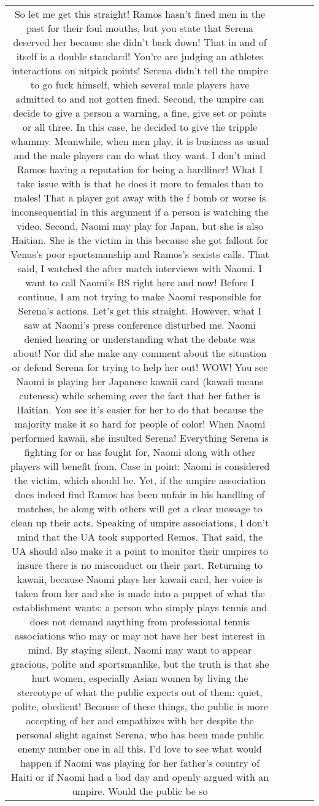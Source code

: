 \documentclass[11pt]{article}
\newlength\mylength
\begin{document}
\begin{center}
\begin{longtable}{|C{.65\mylength}|C{.30\mylength}|C{.12\mylength}|C{.12\mylength}|C{.12\mylength}|}
  \small So let me get this straight! Ramos hasn't fined men in the past for their foul mouths, but you state that Serena deserved her because she didn't back down! That in and of itself is a double standard! You're are judging an athletes interactions on nitpick points! Serena didn't tell the umpire to go fuck himself, which several male players have admitted to and not gotten fined. Second, the umpire can decide to give a person a warning, a fine, give set or points or all three. In this case, he decided to give the tripple whammy. Meanwhile, when men play, it is business as usual and the male players can do what they want. I don't mind Ramos having a reputation for being a hardliner! What I take issue with is that he does it more to females than to males! That a player got away with the f bomb or worse is inconsequential in this argument if a person is watching the video. Second, Naomi may play for Japan, but she is also Haitian. She is the victim in this  because she got fallout for Venus's poor sportsmanship and Ramos's sexists calls. That said, I watched the after match interviews with Naomi. I want to call Naomi's BS right here and now! Before I continue, I am not trying to make Naomi responsible for Serena's actions. Let's get this straight. However, what I saw at Naomi's press conference disturbed me. Naomi denied hearing or understanding what the debate was about! Nor did she make any comment about the situation or defend Serena for trying to help her out! WOW! You see Naomi is playing her Japanese kawaii card (kawaii means cuteness) while scheming over the fact that her father is Haitian. You see it's easier for her to do that because the majority make it so hard for people of color! When Naomi performed kawaii, she insulted Serena! Everything Serena is fighting for or has fought for, Naomi along with other players will benefit from. Case in point: Naomi is considered the victim, which should be. Yet, if the umpire association does indeed find Ramos has  been unfair in his handling of matches, he along with others will get a clear message to clean up their acts. Speaking of umpire associations, I don't mind that the UA took supported Remos. That said, the UA should also make it a point to monitor their umpires to insure there is no misconduct on their part. Returning to kawaii, because Naomi plays her kawaii card, her voice is taken from her and she is made into a puppet of what the establishment wants: a person who simply plays tennis and does not demand anything from professional tennis associations who may or may not have her best interest in mind. By staying silent, Naomi may want to appear gracious, polite and sportsmanlike, but the truth is that she hurt women, especially Asian women by living the stereotype of what the public expects out of them: quiet, polite, obedient! Because of these things, the public is more accepting of her and empathizes with her despite the personal slight against Serena, who has been made public enemy number one in all this. I'd love to see what would happen if Naomi was playing for her father's country of Haiti or if Naomi had a bad day and openly argued with an umpire. Would the public be so 
\end{longtable}
\end{center}
\end{document}
